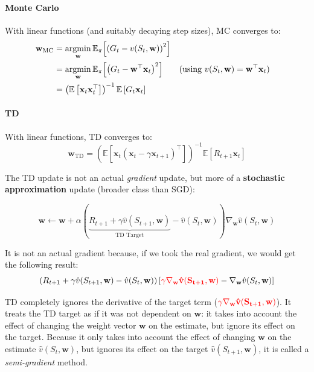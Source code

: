 \paragraph{Monte Carlo} With linear functions (and suitably decaying step sizes), MC converges to:
\begin{align*}
    \mathbf{w}_{\text{MC}} 
    &= \operatorname*{argmin}_{\mathbf{w}} \mathbb{E}_\pi \!\left[ \left(G_t - v(S_t, \mathbf{w})\right)^2 \right] \\
    &= \operatorname*{argmin}_{\mathbf{w}} \mathbb{E}_\pi \!\left[ \left(G_t - \mathbf{w}^\top \mathbf{x}_t\right)^2 \right] && \text{(using } v(S_t, \mathbf{w}) = \mathbf{w}^\top \mathbf{x}_t \text{)} \\
    &= \left( \mathbb{E}\left[ \mathbf{x}_t \mathbf{x}_t^\top \right] \right)^{-1} \mathbb{E}\left[ G_t \mathbf{x}_t \right]
\end{align*}

\paragraph{TD} With linear functions, TD converges to:
\[
    \mathbf{w}_{\text{TD}} = \left( \mathbb{E}\left[ \mathbf{x}_t \left(\mathbf{x}_t - \gamma \mathbf{x}_{t+1}\right)^\top \right] \right)^{-1} \mathbb{E}\left[ R_{t+1}\mathbf{x}_t \right]
\]

The TD update is not an actual \emph{gradient} update, but more of a \textbf{stochastic approximation} update (broader class than SGD):

\[
    \mathbf{w} \gets \mathbf{w} + \alpha ( \underbrace{R_{t+1} + \gamma \hat{v}(S_{t+1}, \mathbf{w})}_{\text{TD Target}} - \hat{v}(S_t, \mathbf{w}) ) \nabla_{\mathbf{w}} \hat{v}(S_t, \mathbf{w})
\]

It is not an actual gradient because, if we took the real gradient, we would get the following result:
$$\left( R_{t+1} + \gamma \hat{v}(S_{t+1}, \mathbf{w}) - \hat{v}(S_t, \mathbf{w}) \right) \left[ \mathbf{\color{red}{\gamma \nabla_{\mathbf{w}} \hat{v}(S_{t+1}, \mathbf{w})}} - \nabla_{\mathbf{w}} \hat{v}(S_t, \mathbf{w}) \right]$$

TD completely ignores the derivative of the target term ($\mathbf{\color{red}{\gamma \nabla_{\mathbf{w}} \hat{v}(S_{t+1}, \mathbf{w})}}$). It treats the TD target as if it was not dependent on $\mathbf{w}$: it takes into account the effect of changing the weight vector $\mathbf{w}$ on the estimate, but ignore its effect on the target. Because it only takes into account the effect of changing $\mathbf{w}$ on the estimate $\hat{v}(S_t, \mathbf{w})$, but ignores its effect on the target $\hat{v}(S_{t+1}, \mathbf{w})$, it is called a \emph{semi-gradient} method.

